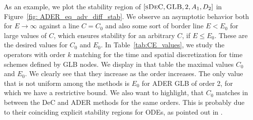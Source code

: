 As an example, we plot the stability region of $[\textsc{sDeC},\textsc{GLB},2, A_1,D_2]$ in Figure~\ref{fig: ADER_eq_adv_diff_stab}. We observe an asymptotic behavior both for $E\rightarrow \infty$ against a line $C=C_0$ and also some sort of border line $E<E_0$ for large values of $C$, which ensures stability for an arbitrary $C$, if $E\le E_0$. These are the desired values for $C_0$ and $E_0$.
In Table~\ref{tab:CE_values}, we study the operators with order $k$ matching for the time and spatial discretization for time schemes defined by GLB nodes. We display in that table the maximal values $C_0$ and $E_0$. 
We clearly see that they increase as the order increases. 
The only value that is not uniform among the methods is $E_0$ for ADER GLB of order 2, for which we have a restrictive bound. 
We also want to highlight, that $C_0$ matches in between the DeC and ADER methods for the same orders. This is probably due to their coinciding explicit stability regions for ODEs, as pointed out in \cite{Han_Veiga_2021}.
